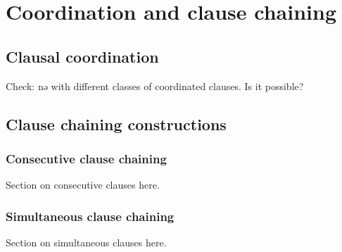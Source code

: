 \chapter{Coordination and clause chaining}\label{chapter:chaining} %

\section{Clausal coordination}

Check: nə with different classes of coordinated clauses. Is it possible?

\section{Clause chaining constructions}\label{clausechain}

\subsection{Consecutive clause chaining}

Section on consecutive clauses here. 

\subsection{Simultaneous clause chaining}

Section on simultaneous clauses here.
